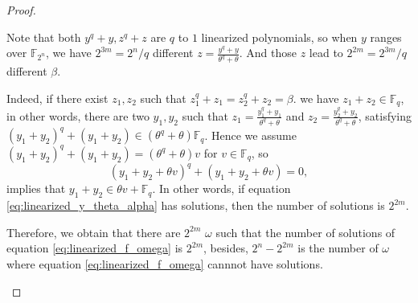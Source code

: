 \documentclass[12 pt]{article}
\def\F{{\mathbb F}}
\begin{document}
{\begin{proof}
\begin{enumerate}[label=(\arabic{*})]
    Note that both $ y^q+y,z^q+z $ are $ q $ to $ 1 $ linearized polynomials, so when $ y $ ranges over $ \F_{2^n} $, 
    we have $ 2^{3m}=2^n/q $ different $ z=\frac{y^q+y}{\theta^q+\theta} $. And those $ z $ lead to $ 2^{2m}=2^{3m}/q $ 
    different $ \beta $. 
    
    Indeed, %
    if there exist $ z_1,z_2 $ such that $ z_1^q+z_1=z_2^q+z_2=\beta $. we have 
    $ z_1+z_2\in\F_q $, in other words, there are two $ y_1,y_2 $ such that $ z_1=\frac{y_1^q+y_1}{\theta^q+\theta} $ 
    and $ z_2=\frac{y_2^q+y_2}{\theta^q+\theta} $, satisfying $  (y_1+y_2)^q+(y_1+y_2)\in\left( \theta^q+\theta \right)\F_q $. 
    Hence we assume $ (y_1+y_2)^q+(y_1+y_2)=\left( \theta^q+\theta \right)v $ for $ v\in\F_q $, so 
    \[(y_1+y_2+\theta v)^q+(y_1+y_2+\theta v)=0,\]
    implies that $ y_1+y_2\in \theta v+\F_q $. 
    In other words, if equation \eqref{eq:linearized_y_theta_alpha} has solutions, then the number of solutions is $ 2^{2m} $.

    Therefore, we obtain that there are $ 2^{2m} $ $ \omega $ 
    such that the number of solutions of equation \eqref{eq:linearized_f_omega} is $ 2^{2m} $, besides, 
    $ 2^{n}-2^{2m} $ is the number of $ \omega $ where equation \eqref{eq:linearized_f_omega} cannnot have solutions.


\end{enumerate}
\end{proof}}
\end{document}
